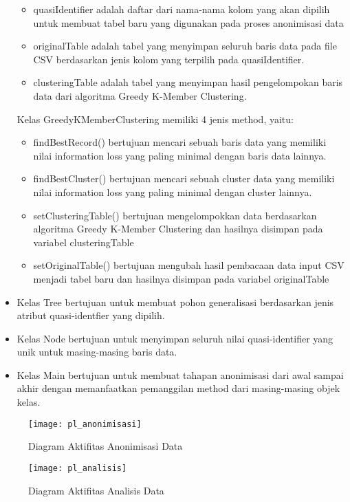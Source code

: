 \begin{itemize}
\begin{itemize}
\item quasiIdentifier adalah daftar dari nama-nama kolom yang akan dipilih untuk membuat tabel baru yang digunakan pada proses anonimisasi data

\item originalTable adalah tabel yang menyimpan seluruh baris data pada file CSV berdasarkan jenis kolom yang terpilih pada quasiIdentifier.

\item clusteringTable adalah tabel yang menyimpan hasil pengelompokan baris data dari algoritma Greedy K-Member Clustering.

\end{itemize}

\noindent Kelas GreedyKMemberClustering memiliki 4 jenis method, yaitu:

\begin{itemize}
\item findBestRecord() bertujuan mencari sebuah baris data yang memiliki nilai information loss yang paling minimal dengan baris data lainnya. 

\item findBestCluster() bertujuan mencari sebuah cluster data yang memiliki nilai information loss yang paling minimal dengan cluster lainnya.

\item setClusteringTable() bertujuan mengelompokkan data berdasarkan algoritma Greedy K-Member Clustering dan hasilnya disimpan pada variabel clusteringTable

\item setOriginalTable() bertujuan mengubah hasil pembacaan data input CSV menjadi tabel baru dan hasilnya disimpan pada variabel originalTable

\end{itemize}

\item Kelas Tree bertujuan untuk membuat pohon generalisasi berdasarkan jenis atribut quasi-identfier yang dipilih.

\item Kelas Node bertujuan untuk menyimpan seluruh nilai quasi-identifier yang unik untuk masing-masing baris data.

\item Kelas Main bertujuan untuk membuat tahapan anonimisasi dari awal sampai akhir dengan memanfaatkan pemanggilan method dari masing-masing objek kelas.

\end{itemize}


\begin{figure}[H]
	\centering
	\texttt{[image: pl\_anonimisasi]}
	\caption{Diagram Aktifitas Anonimisasi Data}
	\label{fig:pl_anonimisasi}
\end{figure}

\begin{figure}[H]
	\centering
	\texttt{[image: pl\_analisis]}
	\caption{Diagram Aktifitas Analisis Data}
	\label{fig:pl_analisis}
\end{figure}